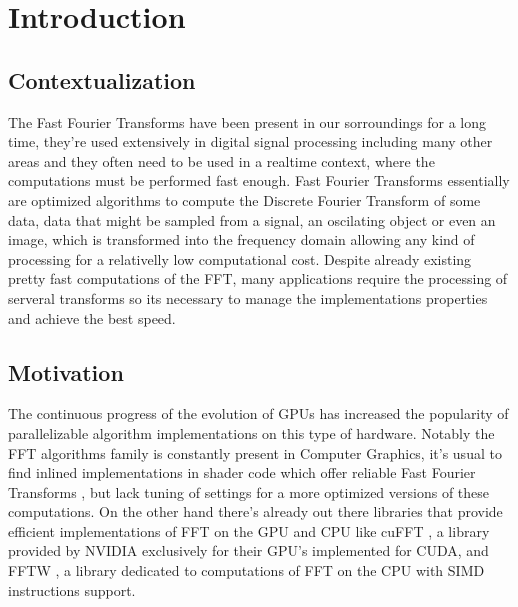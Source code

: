 \documentclass[
  oneside,
  11pt, a4paper,
  footinclude=true,
  headinclude=true,
  cleardoublepage=empty
]{scrbook}
\begin{document}
\chapter{Introduction} \label{chap:introduction}

\section{Contextualization} \label{sec:contextualization}

The Fast Fourier Transforms have been present in our sorroundings for a long time, they're used extensively in digital signal processing including many other areas and they often need to be used in a realtime context, where the computations must be performed fast enough. Fast Fourier Transforms essentially are optimized algorithms to compute the Discrete Fourier Transform of some data, data that might be sampled from a signal, an oscilating object or even an image, which is transformed into the frequency domain allowing any kind of processing for a relativelly low computational cost. Despite already existing pretty fast computations of the FFT, many applications require the processing of serveral transforms so its necessary to manage the implementations properties and achieve the best speed.


\section{Motivation} \label{sec:motivation}

The continuous progress of the evolution of GPUs has increased the popularity of parallelizable algorithm implementations on this type of hardware.
Notably the FFT algorithms family is constantly present in Computer Graphics, it's usual to find inlined implementations in shader code which offer reliable Fast Fourier Transforms \cite{flugge2017realtime}, but lack tuning of settings for a more optimized versions of these computations. On the other hand there's already out there libraries that provide efficient implementations of FFT on the GPU and CPU like cuFFT \cite{nvidiacufft}, a library provided by NVIDIA exclusively for their GPU's implemented for CUDA, and FFTW \cite{frigo2012fftw}, a library dedicated to computations of FFT on the CPU with SIMD instructions support.
\end{document}
